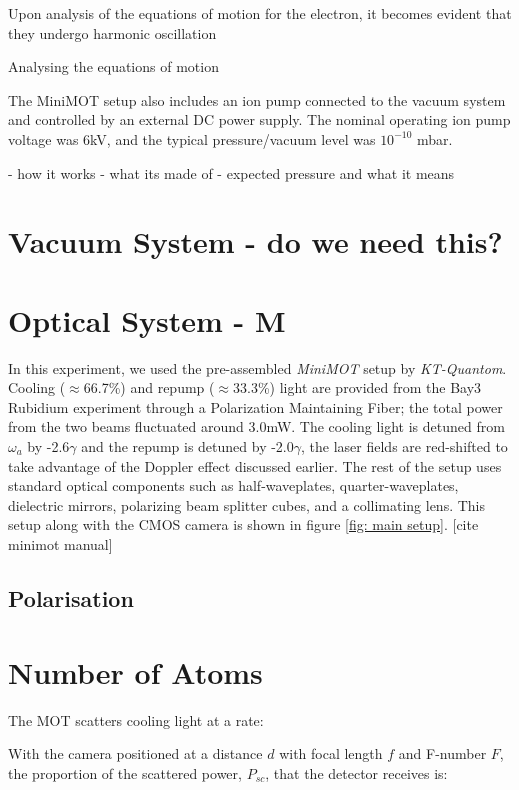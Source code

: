 \documentclass[12pt,twoside]{article}
\begin{document}
Upon analysis of the equations of motion for the electron, it becomes evident that they undergo harmonic oscillation 


Analysing the equations of motion



The MiniMOT setup also includes an ion pump connected to the vacuum system and controlled by an external DC power supply. The nominal operating ion pump voltage was 6kV, and the typical pressure/vacuum level was $10^{-10}$ mbar.

- how it works
- what its made of
- expected pressure and what it means

\section{Vacuum System - do we need this?}


\section{Optical System - M}

In this experiment, we used the pre-assembled \textit{MiniMOT} setup by \textit{KT-Quantom}. Cooling ($\approx$66.7\%) and repump ($\approx$33.3\%) light are provided from the Bay3 Rubidium experiment through a Polarization Maintaining Fiber; the total power from the two beams fluctuated around 3.0mW. The cooling light is detuned from $\omega_a$ by -2.6$\gamma$ and the repump is detuned by -2.0$\gamma$, the laser fields are red-shifted to take advantage of the Doppler effect discussed earlier. The rest of the setup uses standard optical components such as half-waveplates, quarter-waveplates, dielectric mirrors, polarizing beam splitter cubes, and a collimating lens. This setup along with the CMOS camera is shown in figure \ref{fig: main setup}. [cite minimot manual]


\subsection{Polarisation}


\section{Number of Atoms}
The MOT scatters cooling light at a rate:

With the camera positioned at a distance $d$ with focal length $f$ and F-number $F$, the proportion of the scattered power, $P_{sc}$, that the detector receives is:
\end{document}
